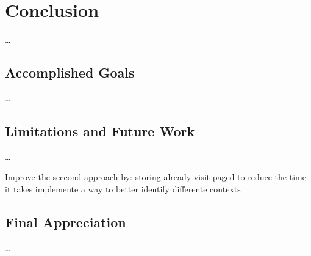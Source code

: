 
\chapter{Conclusion} %
\label{chap:Chapter7}

\dots %

\section{Accomplished Goals}

\dots %

\section{Limitations and Future Work}

\dots %

Improve the seccond approach by:
storing already visit paged to reduce the time it takes
implemente a way to better identify differente contexts

\section{Final Appreciation}

\dots %
